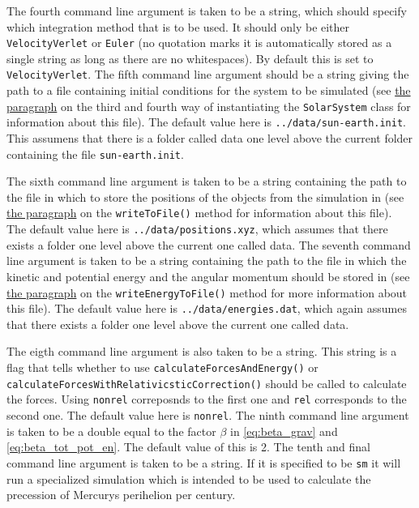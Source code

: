 \documentclass[reprint,english,notitlepage]{revtex4-1}  %
\begin{document}
The fourth command line argument is taken to be a string, which should specify which integration method that is to be used. It should only be either \verb+VelocityVerlet+ or \verb+Euler+ (no quotation marks it is automatically stored as a single string as long as there are no whitespaces). By default this is set to \verb+VelocityVerlet+. The fifth command line argument should be a string giving the path to a file containing initial conditions for the system to be simulated (see \hyperref[poi:initfile]{the paragraph} on the third and fourth way of instantiating the \verb+SolarSystem+ class for information about this file). The default value here is \verb+../data/sun-earth.init+. This assumens that there is a folder called data one level above the current folder containing the file \verb+sun-earth.init+. 

The sixth command line argument is taken to be a string containing the path to the file in which to store the positions of the objects from the simulation in (see \hyperref[poi:write_to_file]{the paragraph} on the \verb+writeToFile()+ method for information about this file). The default value here is \verb+../data/positions.xyz+, which assumes that there exists a folder one level above the current one called data. The seventh command line argument is taken to be a string containing the path to the file in which the kinetic and potential energy and the angular momentum should be stored in (see \hyperref[poi:write_energy_to_file]{the paragraph} on the \verb+writeEnergyToFile()+ method for more information about this file). The default value here is \verb+../data/energies.dat+, which again assumes that there exists a folder one level above the current one called data. 

The eigth command line argument is also taken to be a string. This string is a flag that tells whether to use \verb+calculateForcesAndEnergy()+ or \verb+calculateForcesWithRelativicsticCorrection()+ should be called to calculate the forces. Using \verb+nonrel+ correposnds to the first one and \verb+rel+ corresponds to the second one. The default value here is \verb+nonrel+. The ninth command line argument is taken to be a double equal to the factor $\beta$ in \eqref{eq:beta_grav} and \eqref{eq:beta_tot_pot_en}. The default value of this is 2. The tenth and final command line argument is taken to be a string. If it is specified to be \verb+sm+ it will run a specialized simulation which is intended to be used to calculate the precession of Mercurys perihelion per century. 
\end{document}
